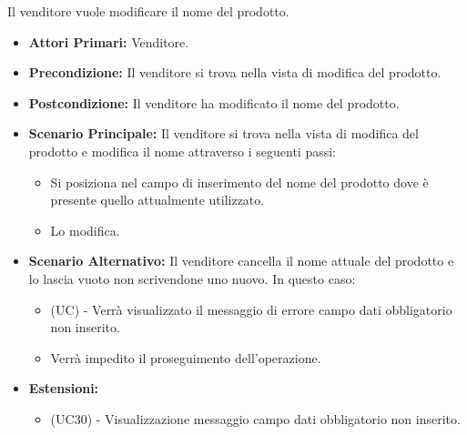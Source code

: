 Il venditore vuole modificare il nome del prodotto.
\begin{itemize}
    \item \textbf{Attori Primari:} Venditore.
    \item \textbf{Precondizione:} Il venditore si trova nella vista di modifica del prodotto.
    \item \textbf{Postcondizione:} Il venditore ha modificato il nome del prodotto.
    \item \textbf{Scenario Principale:} Il venditore si trova nella vista di modifica del prodotto e modifica il nome attraverso i seguenti passi:
    \begin{itemize}
        \item Si posiziona nel campo di inserimento del nome del prodotto dove è presente quello attualmente utilizzato.
        \item Lo modifica.
    \end{itemize}
    \item \textbf{Scenario Alternativo:} Il venditore cancella il nome attuale del prodotto e lo lascia vuoto non scrivendone uno nuovo. In questo caso:
    \begin{itemize}
        \item (UC) - Verrà visualizzato il messaggio di errore campo dati obbligatorio non inserito.
        \item Verrà impedito il proseguimento dell'operazione.
    \end{itemize}
    \item \textbf{Estensioni:}
    \begin{itemize}
        \item (UC30) - Visualizzazione messaggio campo dati obbligatorio non inserito.
    \end{itemize}
\end{itemize}

